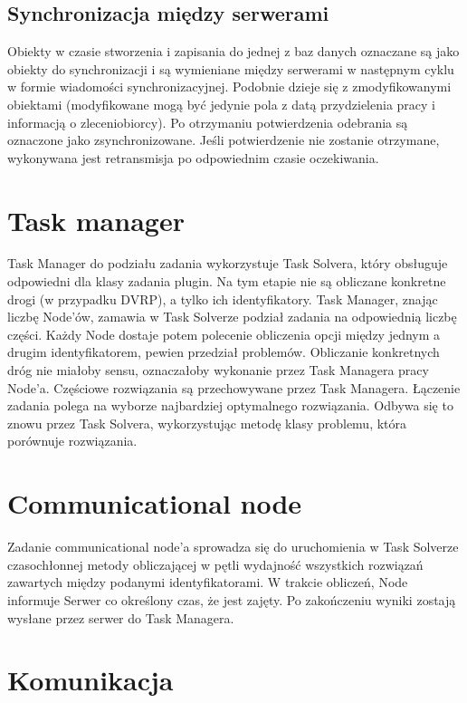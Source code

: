 \documentclass[12pt,a4paper,titlepage]{report}
\begin{document}
	\section{Synchronizacja między serwerami}
		Obiekty w czasie stworzenia i zapisania do jednej z baz danych oznaczane są jako obiekty
		do synchronizacji i są wymieniane między serwerami w następnym cyklu w formie wiadomości
		synchronizacyjnej. Podobnie dzieje się z zmodyfikowanymi obiektami (modyfikowane
		mogą być jedynie pola z datą przydzielenia pracy i informacją o zleceniobiorcy).
		Po otrzymaniu potwierdzenia odebrania są oznaczone jako zsynchronizowane. Jeśli
		potwierdzenie nie zostanie otrzymane, wykonywana jest retransmisja po odpowiednim
		czasie oczekiwania.
	
	\chapter{Task manager}
		Task Manager do podziału zadania wykorzystuje Task Solvera, który obsługuje odpowiedni dla klasy zadania plugin. Na tym etapie nie są obliczane konkretne drogi (w przypadku DVRP), a tylko ich identyfikatory. Task Manager, znając liczbę Node'ów, zamawia w Task Solverze podział zadania na odpowiednią liczbę części. Każdy Node dostaje potem polecenie obliczenia opcji między jednym a drugim identyfikatorem, pewien przedział problemów. Obliczanie konkretnych dróg nie miałoby sensu, oznaczałoby wykonanie przez Task Managera pracy Node'a.
		Częściowe rozwiązania są przechowywane przez Task Managera. Łączenie zadania polega na wyborze najbardziej optymalnego rozwiązania. Odbywa się to znowu przez Task Solvera, wykorzystując metodę klasy problemu, która porównuje rozwiązania.
	
	\chapter{Communicational node}
		Zadanie communicational node'a sprowadza się do uruchomienia w Task Solverze czasochłonnej metody obliczającej w pętli wydajność wszystkich rozwiązań zawartych między podanymi identyfikatorami. W trakcie obliczeń, Node informuje Serwer co określony czas, że jest zajęty. Po zakończeniu wyniki zostają wysłane przez serwer do Task Managera.
		
	\chapter{Komunikacja}
\end{document}
